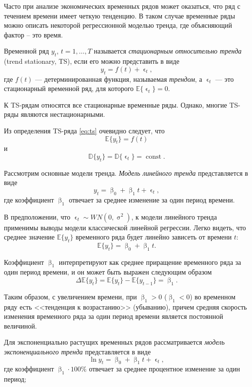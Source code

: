 \documentclass[a4paper, 14pt]{extreport}
\numberwithin{equation}{section}
\renewcommand{\beta}{\upbeta}
\renewcommand{\epsilon}{\upvarepsilon}
\renewcommand{\sigma}{\upsigma}
\newcommand{\E}{\mathbb E}
\newcommand{\const}{\operatorname{const}}
\numberwithin{equation}{section}
\begin{document}
	Часто при анализе экономических временных рядов может оказаться, что ряд с течением времени имеет четкую тенденцию. В таком случае временные ряды можно описать некоторой регрессионной моделью тренда, где объясняющий фактор -- это время.
	
	Временной ряд $y_t$, $t =1,\ldots, T$ называется \textit{стационарным относительно тренда} (trend stationary, TS), если его можно представить в виде
	\begin{equation}
		\label{eq:ts}
		y_t=f(t)+\epsilon_t,
	\end{equation}
	где $f(t)$ --- детерминированная функция, называемая \textit{трендом}, а $\epsilon_t$ --- это стационарный временной ряд, для которого $\E \{\epsilon_t\} = 0$. 
	
	К TS-рядам относятся все стационарные временные ряды. Однако, многие TS-ряды являются нестационарными.
	
	Из определения TS-ряда \ref{eq:ts} очевидно следует, что  $$\E \{y_t\}=f(t)$$ и $$\mathbb D\{y_t\}=\mathbb D\{\epsilon_t\}=\const.$$

	Рассмотрим основные модели тренда.
	\textit{Модель линейного тренда} представляется в виде \begin{equation}
	y_t=\beta_0+\beta_1t+\epsilon_t,
	\end{equation}
	где коэффициент $\beta_1$ отвечает за среднее изменение за один период времени.
	
	В предположении, что $\epsilon_t\sim WN (0,\sigma^2)$, к модели линейного тренда применимы выводы модели классической линейной регрессии. Легко видеть, что среднее значение $\E \{y_t\}$ временного ряда будет линейно зависеть от времени $t$:
	\begin{equation}
		\E \{y_t\}=\beta_0+\beta_1t.
	\end{equation}
	
	Коэффициент $\beta_1$ интерпретируют как среднее приращение временного ряда за один период времени, и он может быть выражен следующим образом
	\begin{equation}
		\Delta \E \{y_t\}=\E \{y_t\}-\E \{y_{t-1}\}=\beta_1.
	\end{equation}
	
	Таким образом, с увеличением времени, при $\beta_1> 0$ ($\beta_1 < 0$) во временном ряду есть <<тенденция к возрастанию>> (убыванию),
	причем средняя скорость изменения временного ряда за один период времени является постоянной величиной.
	
	Для экспоненциально растущих временных рядов рассматривается \textit{модель экспоненциального тренда} представляется в виде
	\begin{equation}
		\ln y_t=\beta_0+\beta_1t+\epsilon_t,
	\end{equation}
	где коэффициент $\beta_1\cdot100\%$ отвечает за среднее процентное изменение за один период;
	
\end{document}
